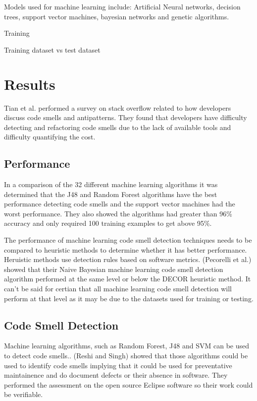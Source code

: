 \documentclass[conference]{IEEEtran}
\begin{document}
Models used for machine learning include: Artificial Neural networks, decision trees, support vector machines, bayesian networks and genetic algorithms.

Training

Training dataset vs test dataset

\section{Results}
Tian et al.\cite{tian_how_2019} performed a survey on stack overflow related to how developers discuss code smells and antipatterns. They found that developers have difficulty detecting and refactoring code smells due to the lack of available tools and difficulty quantifying the cost.
\subsection{Performance}
In a comparison of the 32 different machine learning algorithms\cite{arcelli_fontana_comparing_2016} it was determined that the J48 and Random Forest algorithms have the best performance detecting code smells and the support vector machines had the worst performance. They also showed the algorithms had greater than 96\% accuracy and only required 100 training examples to get above 95\%.

The performance of machine learning code smell detection techniques needs to be compared to heuristic methods to determine whether it has better performance. Heruistic methods use detection rules based on software metrics. (Pecorelli et al.) showed\cite{pecorelli_comparing_2019} that their Naive Bayesian machine learning code smell detection algorithm performed at the same level or below the DECOR heuristic method. 
It can't be said for certian that all machine learning code smell detection will perform at that level as it may be due to the datasets used for training or testing.
\subsection{Code Smell Detection}
Machine learning algorithms, such as Random Forest, J48 and SVM can be used to detect code smells.\cite{reshi_investigating_2019}. (Reshi and Singh) showed that those algorithms could be used to identify code smells implying that it could be used for preventative maintainence and do document defects or their absence in software. They performed the assessment on the open source Eclipse software so their work could be verifiable.
\end{document}
